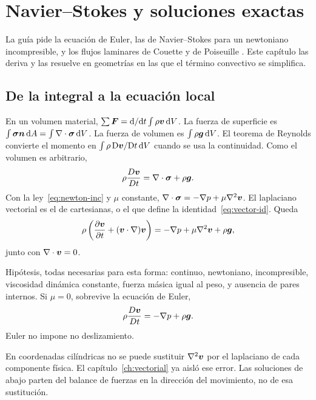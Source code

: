 \chapter{Navier--Stokes y soluciones exactas}
\label{ch:navier}

La guía pide la ecuación de Euler, las de Navier--Stokes para un newtoniano incompresible, y los flujos laminares de Couette y de Poiseuille \parencite{uleGuia2026}. Este capítulo las deriva y las resuelve en geometrías en las que el término convectivo se simplifica.

\section{De la integral a la ecuación local}

En un volumen material, \(\sum\boldsymbol{F}=\mathrm{d}/\mathrm{d}t\int\rho\boldsymbol{v}\,\mathrm{d}V\). La fuerza de superficie es \(\int\boldsymbol{\sigma}\boldsymbol{n}\,\mathrm{d}A=\int\nabla\cdot\boldsymbol{\sigma}\,\mathrm{d}V\). La fuerza de volumen es \(\int\rho\boldsymbol{g}\,\mathrm{d}V\). El teorema de Reynolds convierte el momento en \(\int\rho\,\mathrm{D}\boldsymbol{v}/\mathrm{D}t\,\mathrm{d}V\) cuando se usa la continuidad. Como el volumen es arbitrario,
\begin{equation}
\label{eq:cauchy-momento}
\rho\frac{D\boldsymbol{v}}{Dt}=\nabla\cdot\boldsymbol{\sigma}+\rho\boldsymbol{g}.
\end{equation}
Con la ley~\eqref{eq:newton-inc} y \(\mu\) constante, \(\nabla\cdot\boldsymbol{\sigma}=-\nabla p+\mu\nabla^2\boldsymbol{v}\). El laplaciano vectorial es el de cartesianas, o el que define la identidad~\eqref{eq:vector-id}. Queda
\begin{equation}
\label{eq:ns}
\rho\left(\frac{\partial\boldsymbol{v}}{\partial t}+(\boldsymbol{v}\cdot\nabla)\boldsymbol{v}\right)
=-\nabla p+\mu\nabla^2\boldsymbol{v}+\rho\boldsymbol{g},
\end{equation}
junto con \(\nabla\cdot\boldsymbol{v}=0\).

Hipótesis, todas necesarias para esta forma: continuo, newtoniano, incompresible, viscosidad dinámica constante, fuerza másica igual al peso, y ausencia de pares internos. Si \(\mu=0\), sobrevive la ecuación de Euler,
\begin{equation}
\label{eq:euler}
\rho\frac{D\boldsymbol{v}}{Dt}=-\nabla p+\rho\boldsymbol{g}.
\end{equation}
Euler no impone no deslizamiento.

\begin{errorbox}
En coordenadas cilíndricas no se puede sustituir \(\nabla^2\boldsymbol{v}\) por el laplaciano de cada componente física. El capítulo~\ref{ch:vectorial} ya aisló ese error. Las soluciones de abajo parten del balance de fuerzas en la dirección del movimiento, no de esa sustitución.
\end{errorbox}

